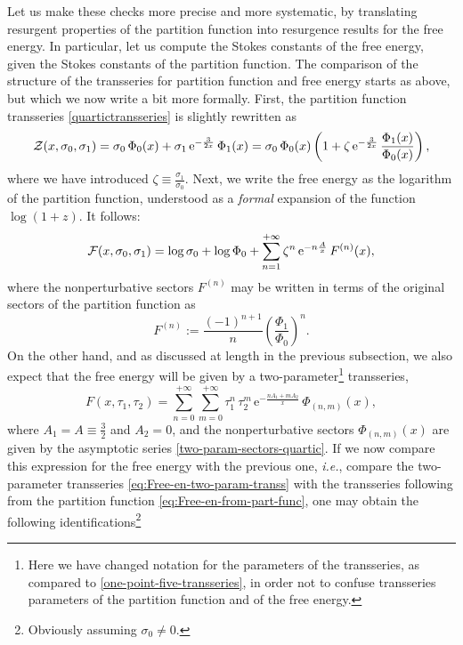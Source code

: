 \documentclass[11pt,a4paper]{article}
\newcommand{\CF}{{\cal F}}
\newcommand{\CZ}{{\cal Z}}
\newcommand{\be}{\begin{equation}}
\newcommand{\ee}{\end{equation}}
\newcommand{\rme}{{\mathrm{e}}}
\begin{document}
Let us make these checks more precise and more systematic, by translating resurgent properties of the partition function into resurgence results for the free energy. In particular, let us compute the Stokes constants of the free energy, given the Stokes constants of the partition function. The comparison of the structure of the transseries for partition function and free energy starts as above, but which we now write a bit more formally. First, the partition function transseries \eqref{quartictransseries} is slightly rewritten as
%
\be
\CZ (x, \sigma_{0}, \sigma_{1}) = \sigma_{0}\, \Phi_0 (x) + \sigma_{1}\, \rme^{-\frac{3}{2x}}\, \Phi_1 (x) = \sigma_{0}\, \Phi_0 (x) \left( 1 + \zeta\, \rme^{-\frac{3}{2x}}\, \frac{\Phi_1 (x)}{\Phi_0 (x)} \right),
\ee
%
\noindent
where we have introduced $\zeta \equiv \frac{\sigma_1}{\sigma_0}$. Next, we write the free energy as the logarithm of the partition function, understood as a \textit{formal} expansion of the function $\log\left(1+z\right)$. It follows:
%
\begin{equation}
\label{eq:Free-en-from-part-func}
\CF (x, \sigma_{0}, \sigma_{1}) = \log \sigma_{0} + \log \Phi_{0} + \sum_{n=1}^{+\infty} \zeta^n\, \rme^{-n \frac{A}{x}}\, F^{(n)}(x),
\end{equation}
%
\noindent
where the nonperturbative sectors $F^{(n)}$ may be written in terms of the original sectors of the partition function as
%
\be
\label{eq:Free-en-sectors-instantons}
F^{(n)} := \frac{(-1)^{n+1}}{n} \left( \frac{\Phi_1}{\Phi_0} \right)^n.
\ee
%
\noindent
On the other hand, and as discussed at length in the previous subsection, we also expect that the free energy will be given by a two-parameter\footnote{Here we have changed notation for the parameters of the transseries, as compared to \eqref{one-point-five-transseries}, in order not to confuse transseries parameters of the partition function and of the free energy.} transseries,
%
\begin{equation}
\label{eq:Free-en-two-param-transs}
F (x, \tau_1, \tau_2) = \sum_{n=0}^{+\infty} \sum_{m=0}^{+\infty} \tau_1^n\, \tau_2^m\, \rme^{-\frac{n A_1 + m A_2}{x}}\, \Phi_{(n,m)} (x),
\end{equation}
%
\noindent
where $A_1 = A \equiv \frac{3}{2}$ and $A_2 = 0$, and the nonperturbative sectors $\Phi_{(n,m)} (x)$ are given by the asymptotic series \eqref{two-param-sectors-quartic}. If we now compare this expression for the free energy with the previous one, \textit{i.e.}, compare the two-parameter transseries \eqref{eq:Free-en-two-param-transs} with the transseries following from the partition function \eqref{eq:Free-en-from-part-func}, one may obtain the following identifications\footnote{Obviously assuming $\sigma_{0}\ne0$.}
\end{document}
